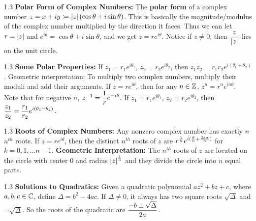 \documentclass{article}
\newcommand{\framethis}[2][1.3]{
  \begin{framed}
    \begin{spacing}{#1}
      #2
    \end{spacing}
  \end{framed}
}
\begin{document}
  \framethis{\textbf{Polar Form of Complex Numbers:}\el
  The \textbf{polar form} of a complex number $z = x+iy \coloneqq \left|z\right| (\cos\theta + i \sin\theta)$.
  This is basically the magnitude/modulus of the complex number multiplied by the direction it faces.
  Thus we can let $r = \left|z\right|$ and $e^{i\theta} = \cos\theta + i\sin\theta$, and we get
  $z = re^{i\theta}$. Notice if $z \neq 0$, then $\displaystyle \frac{z}{\left|z\right|}$ lies on the unit circle.
  }


  \framethis{\textbf{Some Polar Properties:}\el
    If $z_1 = r_1e^{i\theta_1}$, $z_2 = r_2e^{i\theta_2}$, then $z_1z_2=r_1r_2e^{i(\theta_1+\theta_2)}$.
    Geometric interpretation: To multiply two complex numbers, multiply their moduli and add their arguments.\el
    If $z = re^{i\theta}$, then for any $n \in {\mathbb Z}$, $z^n=r^n e^{in\theta}$. Note that for negative $n$, $z^{-1} = 
    \displaystyle \frac{1}{r}e^{-i\theta}.$\el
    If $z_1 = r_1e^{i\theta_1}$, $z_2 = r_2e^{i\theta_2}$, then $\displaystyle\frac{z_1}{z_2}
    = \frac{r_1}{r_2}e^{i(\theta_1 - \theta_2)}$.   
  }


  \framethis{\textbf{Roots of Complex Numbers:} Any nonzero complex number has exactly
  $n$ $n^{th}$ roots.\el
  If $z = re^{i\theta}$, then the distinct $n^{th}$ roots of $z$ are 
  $\displaystyle r^{\frac{1}{n}}e^{i(\frac{\theta}{n} + \frac{2k\pi}{n})}$ for 
  $k = 0,1, \ldots n-1$.\el
  \textbf{Geometric Interpretation:} The $n^{th}$ roots of $z$ are located on the
  circle with center 0 and radius $\left|z\right|^{\frac{1}{n}}$ and they divide the circle
  into $n$ equal parts.}

  \framethis{\textbf{Solutions to Quadratics:} Given a quadratic polynomial 
  $az^2+bz+c$, where $a,b,c \in {\mathbb C}$, define $\Delta = b^2-4ac$. If $\Delta \neq 0$,
  it always has two square roots $\sqrt{\Delta}$ and $-\sqrt{\Delta}$. So the roots
  of the quadratic are $\displaystyle \frac{-b\pm \sqrt{\Delta}}{2a}$.}
\end{document}
